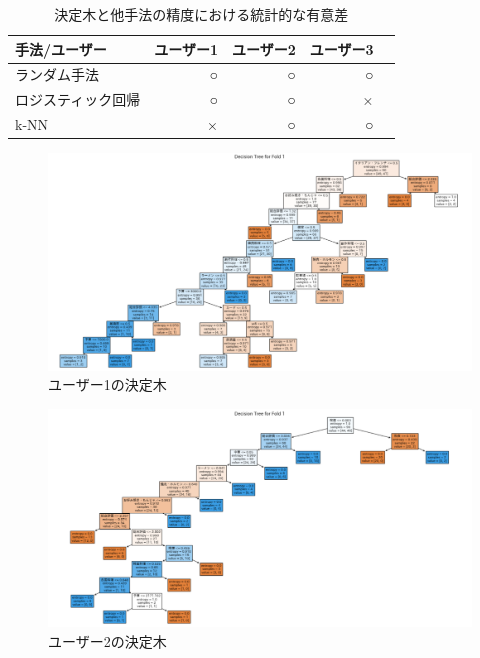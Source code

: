 \documentclass[12pt,a4j]{jreport}
\begin{document}
\begin{table}[htbp]
  \begin{center}
    \begin{tabular}{|l|r|r|r|r|}\hline
      \textbf{手法/ユーザー} & ユーザー1 & ユーザー2 & ユーザー3 \\ \hline
      ランダム手法       & ○        & ○        & ○  \\ \hline
      ロジスティック回帰       & ○        & ○        & × \\ \hline
      k-NN       & ×       & ○        & ○       \\ \hline
    \end{tabular}
  \end{center}
  \caption{決定木と他手法の精度における統計的な有意差}
  \label{Significant_difference_table}
\end{table}

\begin{figure}[htbp]
  \begin{center}
    \includegraphics[width=14cm]{fig4.png}
    \caption{ユーザー1の決定木}
    \label{fig4}
  \end{center}
\end{figure}

\begin{figure}[htbp]
  \begin{center}
    \includegraphics[width=14cm]{fig5.png}
    \caption{ユーザー2の決定木}
    \label{fig5}
  \end{center}
\end{figure}
\end{document}
